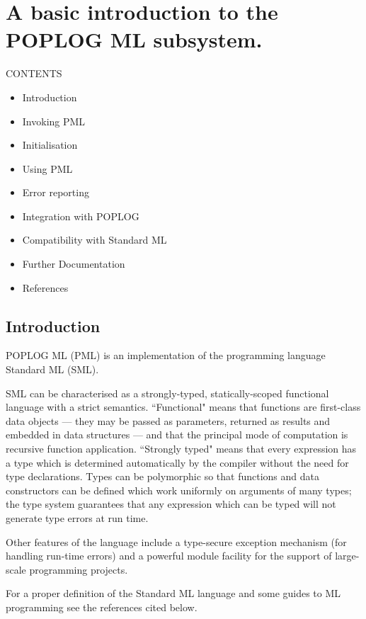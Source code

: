 
\chapter{A basic introduction to the POPLOG ML subsystem.}

         CONTENTS
\begin{itemize}
 \item Introduction
 \item Invoking PML
 \item Initialisation
 \item Using PML
 \item Error reporting
 \item Integration with POPLOG
 \item Compatibility with Standard ML
 \item Further Documentation
 \item References
\end{itemize}

\section{Introduction}

POPLOG ML (PML) is an implementation of the programming language Standard
ML (SML).

SML can be characterised as a strongly-typed, statically-scoped
functional language with a strict semantics. ``Functional" means that
functions are first-class data objects --- they may be passed as
parameters, returned as results and embedded in data structures --- and
that the principal mode of computation is recursive function
application. ``Strongly typed" means that every expression has a type
which is determined automatically by the compiler without the need for
type declarations. Types can be polymorphic so that functions and data
constructors can be defined which work uniformly on arguments of many
types; the type system guarantees that any expression which can be typed
will not generate type errors at run time.

Other features of the language include a type-secure exception mechanism
(for handling run-time errors) and a powerful module facility for the
support of large-scale programming projects.

For a proper definition of the Standard ML language and some guides to
ML programming see the references cited below.



